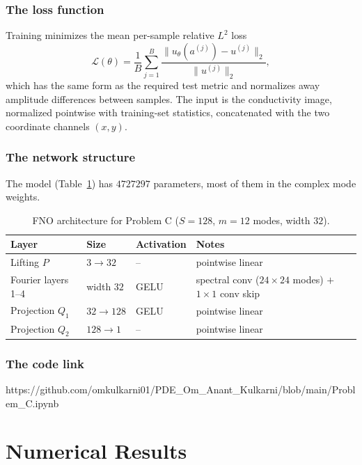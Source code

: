 \subsubsection{The loss function}
Training minimizes the mean per-sample relative $L^2$ loss
\begin{equation}
    \mathcal{L}(\theta) = \frac{1}{B}\sum_{j=1}^{B}
    \frac{\|u_\theta(a^{(j)}) - u^{(j)}\|_2}{\|u^{(j)}\|_2},
\end{equation}
which has the same form as the required test metric and normalizes away
amplitude differences between samples. The input is the conductivity image,
normalized pointwise with training-set statistics, concatenated with the
two coordinate channels $(x,y)$.
%
\subsubsection{The network structure}
The model (Table~\ref{tab:problem_C_net}) has $4727297$ parameters, most of
them in the complex mode weights.
%
\begin{table}[htbp]
\centering
\caption{FNO architecture for Problem C ($S=128$, $m=12$ modes, width $32$).}
\label{tab:problem_C_net}
\begin{tabular}{llll}
\hline
\textbf{Layer} & \textbf{Size} & \textbf{Activation} & \textbf{Notes} \\
\hline
Lifting $P$         & $3 \to 32$   & --   & pointwise linear \\
Fourier layers 1--4 & width $32$   & GELU & spectral conv ($24{\times}24$ modes) $+$ $1{\times}1$ conv skip \\
Projection $Q_1$    & $32 \to 128$ & GELU & pointwise linear \\
Projection $Q_2$    & $128 \to 1$  & --   & pointwise linear \\
\hline
\end{tabular}
\end{table}
%
\subsubsection{The code link}
{https://github.com/omkulkarni01/PDE_Om_Anant_Kulkarni/blob/main/Problem_C.ipynb}
%
\section{Numerical Results}
%
